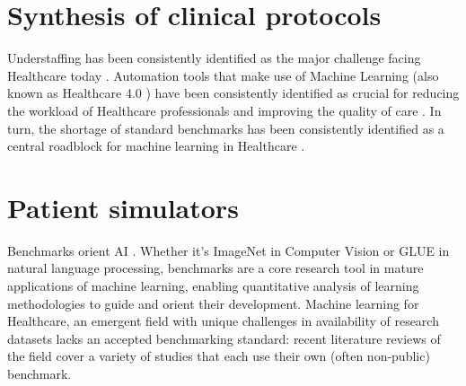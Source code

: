\section{Synthesis of clinical protocols}

Understaffing has been consistently identified as the major challenge facing Healthcare today \cite{ashleyy.metcalfHospitalUnitUnderstaffing2016,SurveyShowsHidden1993,UnderstaffingSignificantIssue2012,campbell_universal_2013, hudsonUnderstaffing2015, mercerMessageEditorinChief2008, r.stanleyUnderstaffedOverwhelmed2010, munnUnderstaffingWardsCompromising2017, thelancetHealthcareSystemStaffing2018}. Automation tools that make use of Machine Learning (also known as Healthcare 4.0 \cite{tortorellaHealthcareTrendsChallenges2020}) have been consistently identified as crucial for reducing the workload of Healthcare professionals and improving the quality of care \cite{agrawalMachineLearningHealthcare2020, deviDesignImplementationAdvanced2022, g.kumarSurveyMachineLearning2016, ganguliMachineLearningPursuit2020, maityMachineLearningImproved2017, mitraMachineLearningHealthcare2021, pianykhImprovingHealthcareOperations2020, xhaferraRoleMachineLearning2022}. In turn, the shortage of standard benchmarks has been consistently identified as a central roadblock for machine learning in Healthcare
\cite{Crown2015Potential, David2020Evaluating, guSupervisedLearningPervasive2023, harutyunyanMultitaskLearningBenchmarking2019, Kathrin2022Benchmark, liventsevEffectivePatientSimulators2021, mcdermottReproducibilityMachineLearning2021, purushothamBenchmarkingDeepLearning2018, S2017Benchmark}.

\newpage
\section{Patient simulators}

Benchmarks orient AI \cite{liangHolisticEvaluationLanguage2022}. Whether it's ImageNet \cite{dengImagenetLargescaleHierarchical2009} in Computer Vision or GLUE \cite{wangGLUEMultitaskBenchmark2018} in natural language processing, benchmarks are a core research tool in mature applications of machine learning, enabling quantitative analysis of learning methodologies to guide and orient their development.
Machine learning for Healthcare, an emergent field with unique challenges in availability of research datasets \cite{Anshik2021Handling, Gilbert2015market, Pahwa2021Big, Yazhini2019State} lacks an accepted benchmarking standard: recent literature reviews \cite{palMachineLearningHealthcare2023,tortorellaHealthcareTrendsChallenges2020} of the field cover a variety of studies that each use their own (often non-public) benchmark.

